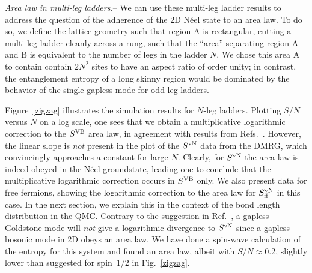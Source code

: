 \documentclass[prl,aps,twocolumn,floatfix,amsmath,amssymb,superscriptaddress,tightenlines]{revtex4}
\begin{document}
 
{\it Area law in multi-leg ladders.}--  
We can use these multi-leg ladder results to address the question of the adherence of the 2D N\'eel state
to an area law.  To do so, we
define the lattice
geometry such that region A is rectangular, cutting a multi-leg ladder
cleanly across a rung, such that the ``area'' separating region A and B is
equivalent to the number of legs in the ladder $N$.  We chose this area A
to contain contain $2N^2$ sites to have an aspect ratio of order unity; in
contrast, the entanglement entropy of a long
skinny region would be dominated by the behavior
of the single gapless mode for odd-leg ladders.

Figure~\ref{zigzag} illustrates the simulation results for $N$-leg ladders.
Plotting $S/N$ versus $N$ on a log scale, one sees that we obtain a
multiplicative logarithmic correction to the $S^{\rm VB}$ area law, in agreement
with results from Refs.~\cite{Alet,Chh}.  However, the linear slope is {\it not} present in
the plot of the $S^{ \rm vN}$ data from the DMRG, which convincingly approaches a
constant for large $N$.  Clearly, for $S^{ \rm vN}$ the area law is
indeed obeyed in the N\'eel groundstate, leading one to conclude that the
multiplicative logarithmic correction occurs in $S^{\rm VB}$ only.  We
also present data for free fermions, showing the logarithmic correction to the area law
for $S^{ \rm vN}_{\rm ff}$ in this case\cite{2dfermion}.
In the next section, we explain this 
in the context of the bond length distribution in the QMC.
Contrary to the suggestion in Ref.~\cite{Alet}, a gapless Goldstone mode will {\it not} give a logarithmic
divergence to $S^{ \rm vN}$ since a gapless bosonic mode in 2D
obeys an area law\cite{2dboson}.  We have done a spin-wave calculation of
the entropy for this system and found an area law, albeit with
$S/N\approx 0.2$, slightly lower than suggested for spin~$1/2$ in Fig.~\ref{zigzag}.
\end{document}

